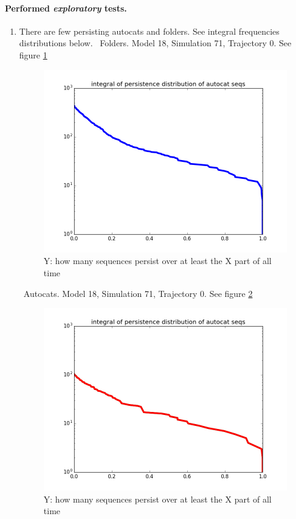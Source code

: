 \documentclass[journal=jacsat,manuscript=article,layout=twocolumn]{achemso}
\begin{document}
\paragraph{Performed \emph{exploratory} tests.} 
\begin{enumerate}
 \item [(1)] There are few persisting autocats and folders. See integral frequencies distributions 
below.
  \subitem \textbullet\, Folders. Model 18, Simulation 71, Trajectory 0. See figure 
\ref{fig:foldTimeDistr}
  \begin{figure}[htb!]
  \centering
  \includegraphics[width=\columnwidth]{inno-fig/exp_foldTimeDistr.png} 
  \caption{Y: how many sequences persist over at least the X part of all time}
  \label{fig:foldTimeDistr}
\end{figure} 
 \subitem \textbullet\, Autocats. Model 18, Simulation 71, Trajectory 0. See figure 
\ref{fig:autoTimeDistr}
 \begin{figure}[htb!]
  \centering
  \includegraphics[width=\columnwidth]{inno-fig/exp_autoTimeDistr.png} 
  \caption{Y: how many sequences persist over at least the X part of all time}
  \label{fig:autoTimeDistr}
\end{figure}


\end{enumerate}
\end{document}
